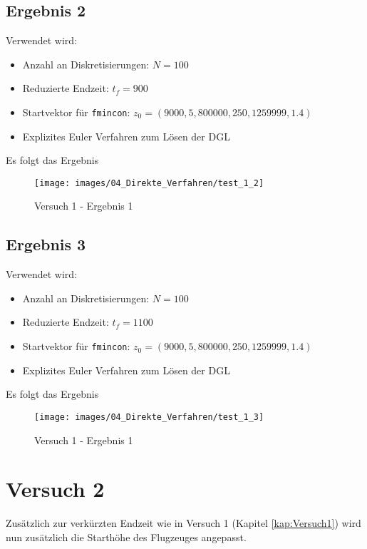 \newpage
\subsection{Ergebnis 2}
Verwendet wird:
\begin{itemize}
\item Anzahl an Diskretisierungen: $N = 100$ 
\item Reduzierte Endzeit: $t_f = 900$
\item Startvektor für \texttt{fmincon}: $z_0 = (9000,5,800000,250,1259999,1.4)$
\item Explizites Euler Verfahren zum Lösen der DGL
\end{itemize}
Es folgt das Ergebnis
\begin{figure}[H]
\begin{center}
\texttt{[image: images/04\_Direkte\_Verfahren/test\_1\_2]}
\caption{Versuch 1 - Ergebnis 1}\label{img:test_1_2}
\end{center}
\end{figure}

\newpage
\subsection{Ergebnis 3}
Verwendet wird:
\begin{itemize}
\item Anzahl an Diskretisierungen: $N = 100$ 
\item Reduzierte Endzeit: $t_f = 1100$
\item Startvektor für \texttt{fmincon}: $z_0 = (9000,5,800000,250,1259999,1.4)$
\item Explizites Euler Verfahren zum Lösen der DGL
\end{itemize}
Es folgt das Ergebnis
\begin{figure}[H]
\begin{center}
\texttt{[image: images/04\_Direkte\_Verfahren/test\_1\_3]}
\caption{Versuch 1 - Ergebnis 1}\label{img:test_1_3}
\end{center}
\end{figure}















\newpage
\section{Versuch 2}
Zusätzlich zur verkürzten Endzeit wie in Versuch 1 (Kapitel \ref{kap:Versuch1}) wird nun zusätzlich die Starthöhe des Flugzeuges angepasst.

